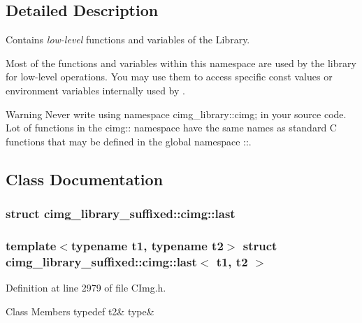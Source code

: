 \subsection{Detailed Description}
Contains {\itshape low-\/level} functions and variables of the  Library. 

Most of the functions and variables within this namespace are used by the  library for low-\/level operations. You may use them to access specific const values or environment variables internally used by . \begin{DoxyWarning}{Warning}
Never write {\ttfamily using namespace cimg\+\_\+library\+::cimg;} in your source code. Lot of functions in the {\ttfamily cimg\+:\+: namespace} have the same names as standard C functions that may be defined in the global namespace {\ttfamily \+:\+:}. 
\end{DoxyWarning}


\subsection{Class Documentation}
\label{structcimg__library__suffixed_1_1cimg_1_1last}
\subsubsection{struct cimg\+\_\+library\+\_\+suffixed\+:\+:cimg\+:\+:last}
\subsubsection*{template$<$typename t1, typename t2$>$\newline
struct cimg\+\_\+library\+\_\+suffixed\+::cimg\+::last$<$ t1, t2 $>$}



Definition at line 2979 of file C\+Img.\+h.

\begin{DoxyFields}{Class Members}
\mbox{\label{namespacecimg__library__suffixed_1_1cimg_a5e61c40425c0b12941add4d01a776591}} 
typedef t2&
type&
\\
\hline

\end{DoxyFields}
\label{structcimg__library__suffixed_1_1cimg_1_1superset}
